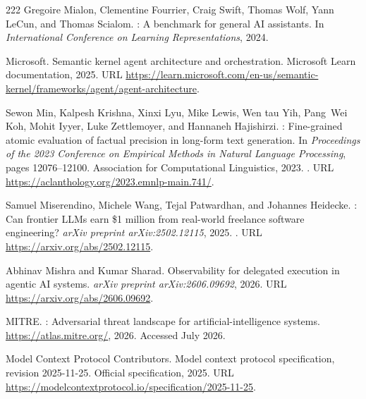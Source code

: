 \begin{thebibliography}{222}
Gregoire Mialon, Clementine Fourrier, Craig Swift, Thomas Wolf, Yann LeCun, and
  Thomas Scialom.
: A benchmark for general {AI} assistants.
\newblock In \emph{International Conference on Learning Representations}, 2024.

{Microsoft}.
\newblock Semantic kernel agent architecture and orchestration.
\newblock Microsoft Learn documentation, 2025.
\newblock URL
  \url{https://learn.microsoft.com/en-us/semantic-kernel/frameworks/agent/agent-architecture}.

Sewon Min, Kalpesh Krishna, Xinxi Lyu, Mike Lewis, Wen tau Yih, Pang~Wei Koh,
  Mohit Iyyer, Luke Zettlemoyer, and Hannaneh Hajishirzi.
: Fine-grained atomic evaluation of factual precision in
  long-form text generation.
\newblock In \emph{Proceedings of the 2023 Conference on Empirical Methods in
  Natural Language Processing}, pages 12076--12100. Association for
  Computational Linguistics, 2023.
\newblock {}.
\newblock URL \url{https://aclanthology.org/2023.emnlp-main.741/}.

Samuel Miserendino, Michele Wang, Tejal Patwardhan, and Johannes Heidecke.
: Can frontier {LLM}s earn \$1 million from real-world
  freelance software engineering?
\newblock \emph{arXiv preprint arXiv:2502.12115}, 2025.
\newblock {}.
\newblock URL \url{https://arxiv.org/abs/2502.12115}.

Abhinav Mishra and Kumar Sharad.
\newblock Observability for delegated execution in agentic {AI} systems.
\newblock \emph{arXiv preprint arXiv:2606.09692}, 2026.
\newblock URL \url{https://arxiv.org/abs/2606.09692}.

{MITRE}.
: Adversarial threat landscape for artificial-intelligence
  systems.
\newblock \url{https://atlas.mitre.org/}, 2026.
\newblock Accessed July 2026.

{Model Context Protocol Contributors}.
\newblock Model context protocol specification, revision 2025-11-25.
\newblock Official specification, 2025.
\newblock URL \url{https://modelcontextprotocol.io/specification/2025-11-25}.


\end{thebibliography}

